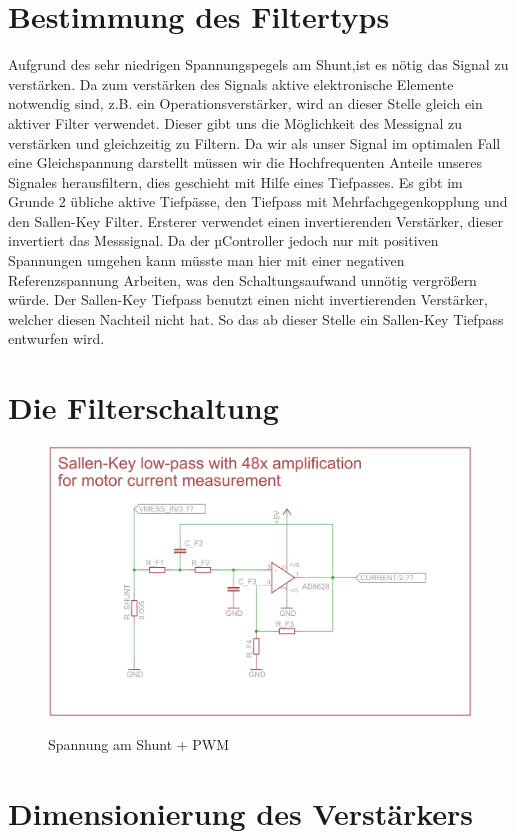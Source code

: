 \section{Bestimmung des Filtertyps}
Aufgrund des sehr niedrigen Spannungspegels am Shunt,ist es nötig das Signal zu verstärken. Da zum verstärken des Signals aktive elektronische Elemente notwendig sind,
z.B. ein Operationsverstärker, wird an dieser Stelle gleich ein aktiver Filter verwendet. Dieser gibt uns die Möglichkeit des Messignal zu verstärken und gleichzeitig zu
Filtern. Da wir als unser Signal im optimalen Fall eine Gleichspannung darstellt müssen wir die Hochfrequenten Anteile unseres Signales herausfiltern, dies geschieht 
mit Hilfe eines Tiefpasses. Es gibt im Grunde 2 übliche aktive Tiefpässe, den Tiefpass mit Mehrfachgegenkopplung und den Sallen-Key Filter. Ersterer verwendet
einen invertierenden Verstärker, dieser invertiert das Messsignal. Da der µController jedoch nur mit positiven Spannungen umgehen kann müsste man hier mit einer 
negativen Referenzspannung Arbeiten, was den Schaltungsaufwand unnötig vergrößern würde. Der Sallen-Key Tiefpass benutzt einen nicht invertierenden Verstärker, welcher diesen
Nachteil nicht hat. So das ab dieser Stelle ein Sallen-Key Tiefpass entwurfen wird.


\section{Die Filterschaltung}
\begin{figure}[H]
\centering
\includegraphics[width=.8\textwidth]{filter_schaltung.png}\\
\caption{Spannung am Shunt + PWM}%
\label{fig:pwm+i}
\end{figure}



\section{Dimensionierung des Verstärkers}

